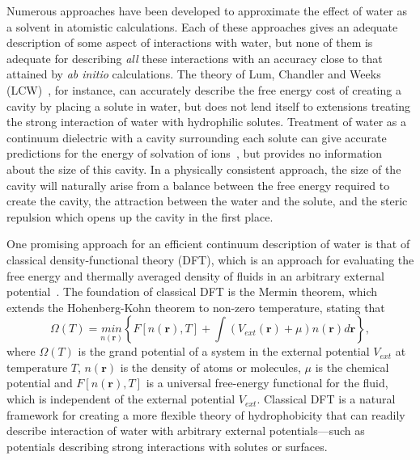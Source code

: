 \documentclass[twocolumn,amsmath,amssymb,prl]{revtex4-1}
\newcommand{\rr}{\textbf{r}}
\begin{document}
Numerous approaches have been developed to approximate the effect of water
as a solvent in atomistic calculations.  Each of these approaches gives an
adequate description of some aspect of interactions with water, but none of
them is adequate for describing \emph{all} these interactions with an
accuracy close to that attained by \emph{ab initio} calculations.  The
theory of Lum, Chandler and Weeks (LCW)~\cite{lum1999hydrophobicity}, for 
instance, can
accurately describe the free energy cost of creating a cavity by placing a
solute in water, but does not lend itself to extensions treating the strong
interaction of water with hydrophilic solutes.  Treatment of water as a
continuum dielectric with a cavity surrounding each solute can give
accurate predictions for the energy of solvation of ions~\cite{latimer1939,
rashin1985, zhan1998, hsu1999, hildebrandt2004, hildebrandt2007}, but
provides no information about the size of this cavity.  In a physically
consistent approach, the size of the cavity will naturally arise from a
balance between the free energy required to create the cavity, the
attraction between the water and the solute, and the steric repulsion which
opens up the cavity in the first place.

One promising approach for an efficient continuum description of water
is that of classical density-functional theory (DFT), which is an
approach for evaluating the free energy and thermally averaged density
of fluids in an arbitrary external potential~\cite{ebner1976density}.
The foundation of classical DFT is the Mermin
theorem\cite{mermin1965thermal}, which extends the Hohenberg-Kohn
theorem\cite{hohenberg1964inhomogeneous} to non-zero temperature,
stating that
\begin{equation}
  \Omega (T) = \underset{n(\rr)}{min}\left\{ F[n(\rr),T] + \int (V_\textit{ext}(\rr) +\mu)n(\rr)
d\rr\right\},
\end{equation}
where $\Omega (T)$ is the grand potential of a system in the external
potential $V_\textit{ext}$ at temperature $T$, $n(\rr)$ is the density
of atoms or molecules, $\mu$ is the chemical potential and
$F[n(\rr),T]$ is a universal free-energy functional for the fluid,
which is independent of the external potential $V_\textit{ext}$.
Classical DFT is a natural framework for creating a more flexible
theory of hydrophobicity that can readily describe interaction of
water with arbitrary external potentials---such as potentials
describing strong interactions with solutes or surfaces.
\end{document}
